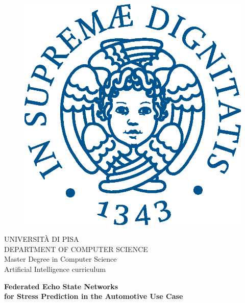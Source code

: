 \begin{titlepage}
\begin{figure}[!htb]
    \centering
    \includegraphics[keepaspectratio=true,scale=0.5]{contents/Frontpage/cherubinFrontespizio.eps}
\end{figure}

\begin{center}
    \LARGE{UNIVERSITÀ DI PISA}
    \vspace{5mm}
    \\ \large{DEPARTMENT OF COMPUTER SCIENCE}
    \vspace{5mm}
    \\ \large{Master Degree in Computer Science} \vspace{5mm}
    \\ \large{Artificial Intelligence curriculum}
\end{center}

\vspace{20mm}
\begin{center}
    {\large{\bf Federated Echo State Networks \\ \vspace{3mm} for Stress Prediction in the Automotive Use Case}}
\end{center}
\vspace{30mm}


\end{titlepage}
